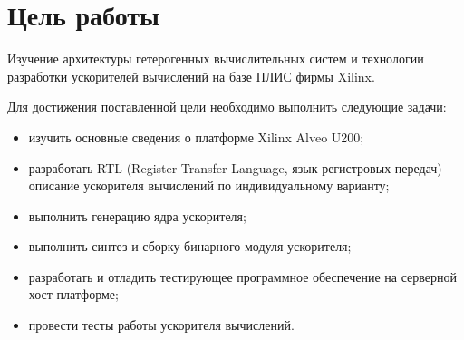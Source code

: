 \chapter*{Цель работы}
Изучение архитектуры гетерогенных вычислительных систем и технологии разработки ускорителей вычислений на базе ПЛИС фирмы Xilinx.

Для достижения поставленной цели необходимо выполнить следующие задачи:
\begin{itemize}
	\item изучить основные сведения о платформе Xilinx Alveo U200;
	\item разработать RTL (Register Transfer Language, язык регистровых передач) описание ускорителя вычислений по индивидуальному варианту;
	\item выполнить генерацию ядра ускорителя;
	\item выполнить синтез и сборку бинарного модуля ускорителя;
	\item разработать и отладить тестирующее программное обеспечение на
	серверной хост-платформе;
	\item провести тесты работы ускорителя вычислений.
\end{itemize}